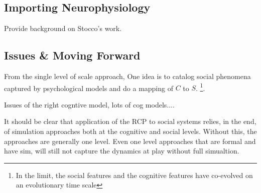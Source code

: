 \documentclass{article}
\begin{document}
\subsection{Importing Neurophysiology}
Provide background on Stocco's work.

\subsection{Issues \& Moving Forward}
From the single level of scale approach, One idea is to catalog social phenomena captured by psychological models and do a mapping of $C$ to $S$. \footnote{In the limit, the social features and the cognitive features have co-evolved on an evolutionary time scale}.

Issues of the right cogntive model, lots of cog models....

It should be clear that application of the RCP to social systems relies, in the end, of simulation approaches both at the cognitive and social levels.  Without this, the approaches are generally one level.  Even one level approaches that are formal and have sim, will still not capture the dynamics at play without full simualtion.  
\end{document}
